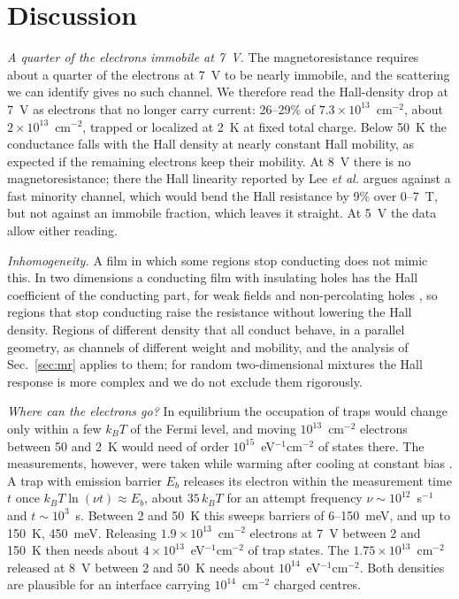 \documentclass[11pt]{article}
\begin{document}
\section{Discussion}\label{sec:disc}
\emph{A quarter of the electrons immobile at 7~V.} The magnetoresistance requires about a quarter of the electrons at 7~V to be nearly immobile, and the scattering we can identify gives no such channel. We therefore read the Hall-density drop at 7~V as electrons that no longer carry current: 26--29\% of $7.3\times10^{13}$~cm$^{-2}$, about $2\times10^{13}$~cm$^{-2}$, trapped or localized at 2~K at fixed total charge. Below 50~K the conductance falls with the Hall density at nearly constant Hall mobility, as expected if the remaining electrons keep their mobility. At 8~V there is no magnetoresistance; there the Hall linearity reported by Lee \emph{et al.} argues against a fast minority channel, which would bend the Hall resistance by 9\% over 0--7~T, but not against an immobile fraction, which leaves it straight. At 5~V the data allow either reading.

\emph{Inhomogeneity.} A film in which some regions stop conducting does not mimic this. In two dimensions a conducting film with insulating holes has the Hall coefficient of the conducting part, for weak fields and non-percolating holes \cite{Juretschke1956}, so regions that stop conducting raise the resistance without lowering the Hall density. Regions of different density that all conduct behave, in a parallel geometry, as channels of different weight and mobility, and the analysis of Sec.~\ref{sec:mr} applies to them; for random two-dimensional mixtures the Hall response is more complex and we do not exclude them rigorously.

\emph{Where can the electrons go?} In equilibrium the occupation of traps would change only within a few $k_BT$ of the Fermi level, and moving $10^{13}$~cm$^{-2}$ electrons between 50 and 2~K would need of order $10^{15}$~eV$^{-1}$cm$^{-2}$ of states there. The measurements, however, were taken while warming after cooling at constant bias \cite{Lee2024LIO}. A trap with emission barrier $E_b$ releases its electron within the measurement time $t$ once $k_BT\ln(\nu t)\approx E_b$, about $35\,k_BT$ for an attempt frequency $\nu\sim10^{12}$~s$^{-1}$ and $t\sim10^3$~s. Between 2 and 50~K this sweeps barriers of 6--150~meV, and up to 150~K, 450~meV. Releasing $1.9\times10^{13}$~cm$^{-2}$ electrons at 7~V between 2 and 150~K then needs about $4\times10^{13}$~eV$^{-1}$cm$^{-2}$ of trap states. The $1.75\times10^{13}$~cm$^{-2}$ released at 8~V between 2 and 50~K needs about $10^{14}$~eV$^{-1}$cm$^{-2}$. Both densities are plausible for an interface carrying $10^{14}$~cm$^{-2}$ charged centres.
\end{document}

